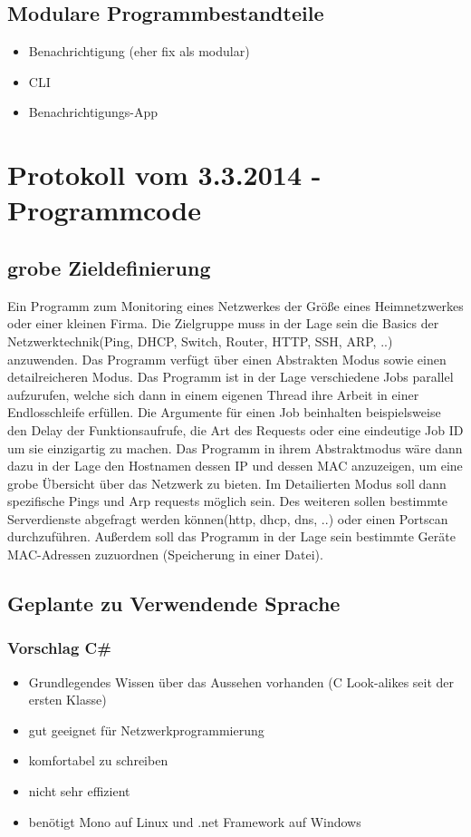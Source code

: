\documentclass[10pt,a4paper]{report}
\begin{document}
\section{Modulare Programmbestandteile}
\begin{itemize}
\item Benachrichtigung (eher fix als modular)
\item CLI
\item Benachrichtigungs-App
\end{itemize}
\chapter{Protokoll vom 3.3.2014 - Programmcode}
\section{grobe Zieldefinierung}
Ein Programm zum Monitoring eines Netzwerkes der Größe eines Heimnetzwerkes oder einer kleinen Firma. Die Zielgruppe muss in der Lage sein die Basics der Netzwerktechnik(Ping, DHCP, Switch, Router, HTTP, SSH, ARP, ..) anzuwenden. Das Programm verfügt über einen Abstrakten Modus sowie einen detailreicheren Modus. Das Programm ist in der Lage verschiedene Jobs parallel aufzurufen, welche sich dann in einem eigenen Thread ihre Arbeit in einer Endlosschleife erfüllen. Die Argumente für einen Job beinhalten beispielsweise den Delay der Funktionsaufrufe, die Art des Requests oder eine eindeutige Job ID um sie einzigartig zu machen. Das Programm in ihrem Abstraktmodus wäre dann dazu in der Lage den Hostnamen dessen IP und dessen MAC anzuzeigen, um eine grobe Übersicht über das Netzwerk zu bieten. Im Detailierten Modus soll dann spezifische Pings und Arp requests möglich sein. Des weiteren sollen bestimmte Serverdienste abgefragt werden können(http, dhcp, dns, ..) oder einen Portscan durchzuführen. Außerdem soll das Programm in der Lage sein bestimmte Geräte MAC-Adressen zuzuordnen (Speicherung in einer Datei). 
\section{Geplante zu Verwendende Sprache}
\subsection{Vorschlag C\#}
\begin{itemize}
\item Grundlegendes Wissen über das Aussehen vorhanden (C Look-alikes seit der ersten Klasse)
\item gut geeignet für Netzwerkprogrammierung
\item komfortabel zu schreiben
\item nicht sehr effizient
\item benötigt Mono auf Linux und .net Framework auf Windows
\end{itemize}
\end{document}
